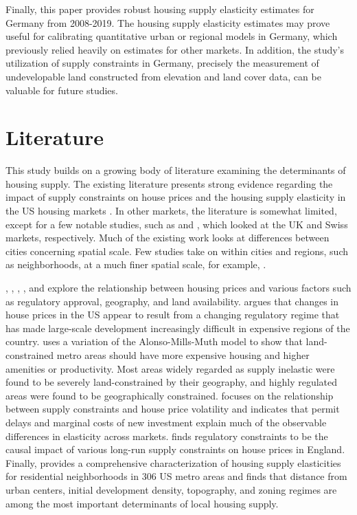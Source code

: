 \documentclass[
  12pt,
]{article}
\begin{document}
Finally, this paper provides robust housing supply elasticity estimates for Germany from 2008-2019. The housing supply elasticity estimates may prove useful for calibrating quantitative urban or regional models in Germany, which previously relied heavily on estimates for other markets. In addition, the study's utilization of supply constraints in Germany, precisely the measurement of undevelopable land constructed from elevation and land cover data, can be valuable for future studies.

\section{Literature}\label{literature}

This study builds on a growing body of literature examining the determinants of housing supply. The existing literature presents strong evidence regarding the impact of supply constraints on house prices and the housing supply elasticity in the US housing markets \citep{glaeser-gyourko2005, saiz2010, paciorek2013, baumsnow-han2019}. In other markets, the literature is somewhat limited, except for a few notable studies, such as \citet{hilber-vermeulen2016} and \citet{büchler2021}, which looked at the UK and Swiss markets, respectively. Much of the existing work looks at differences between cities concerning spatial scale. Few studies take on within cities and regions, such as neighborhoods, at a much finer spatial scale, for example, \citet{baumsnow-han2019}.

\citet{glaeser-gyourko2005}, \citet{saiz2010}, \citet{paciorek2013}, \citet{hilber-vermeulen2016}, and \citet{baumsnow-han2019} explore the relationship between housing prices and various factors such as regulatory approval, geography, and land availability. \citet{glaeser-gyourko2005} argues that changes in house prices in the US appear to result from a changing regulatory regime that has made large-scale development increasingly difficult in expensive regions of the country. \citet{saiz2010} uses a variation of the Alonso-Mills-Muth model to show that land-constrained metro areas should have more expensive housing and higher amenities or productivity. Most areas widely regarded as supply inelastic were found to be severely land-constrained by their geography, and highly regulated areas were found to be geographically constrained. \citet{paciorek2013} focuses on the relationship between supply constraints and house price volatility and indicates that permit delays and marginal costs of new investment explain much of the observable differences in elasticity across markets. \citet{hilber-vermeulen2016} finds regulatory constraints to be the causal impact of various long-run supply constraints on house prices in England. Finally, \citet{baumsnow-han2019} provides a comprehensive characterization of housing supply elasticities for residential neighborhoods in 306 US metro areas and finds that distance from urban centers, initial development density, topography, and zoning regimes are among the most important determinants of local housing supply.
\end{document}
